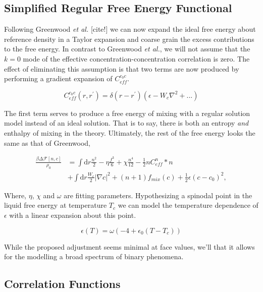 \documentclass[showkeys, reprint]{revtex4-1}
\newcommand{\F}{\mathcal{F}}
\renewcommand{\d}{\mathrm{d}}
\renewcommand{\l}{\left}
\renewcommand{\r}{\right}
\newcommand{\f}{\frac}
\begin{document}
\subsection{Simplified Regular Free Energy Functional}

Following Greenwood \textit{et al.} [cite!] we can now expand the ideal free energy about reference density in a Taylor expansion and coarse grain the excess contributions to the free energy. In contrast to Greenwood \textit{et al.}, we will not assume that the $k = 0$ mode of the effective concentration-concentration correlation is zero. The effect of eliminating this assumption is that two terms are now produced by performing a gradient expansion of $C^{c_0c}_{eff}$.

\begin{equation}
	C^{c_0 c}_{eff}(r, r^\prime) = \delta(r - r^\prime)\l(\epsilon  - W_c \nabla^2 + ... \r)
\end{equation}

The first term serves to produce a free energy of mixing with a regular solution model instead of an ideal solution. That is to say, there is both an entropy \textit{and} enthalpy of mixing in the theory. Ultimately, the rest of the free energy looks the same as that of Greenwood,

\begin{align}
	\f{\beta \Delta \F[n, c]}{\rho_0} &= \int \d r \f{n^2}{2} - \eta \f{f^3}{6} + \chi \f{n^4}{12} -\f{1}{2} n C^{n}_{eff} \ast n \\
	&+ \int \d r \f{W_c}{2} \l\vert\nabla c\r\vert^2 + (n + 1) f_{mix}(c) + \f{1}{2} \epsilon (c- c_0)^2, \nonumber
\end{align}

Where, $\eta$, $\chi$ and $\omega$ are fitting parameters. Hypothesizing a spinodal point in the liquid free energy at temperature $T_c$ we can model the temperature dependence of $\epsilon$ with a linear expansion about this point. 

\begin{equation}
	\epsilon(T) = \omega \l( -4 + \epsilon_0 \l(T - T_c\r)\r) 
\end{equation}

While the proposed adjustment seems minimal at face values, we'll that it allows for the modelling a broad spectrum of binary phenomena.

\subsection{Correlation Functions}
\end{document}
